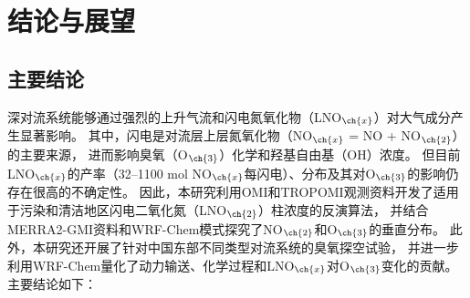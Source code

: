 
\chapter{结论与展望}

\section{主要结论}

深对流系统能够通过强烈的上升气流和闪电氮氧化物（LNO$_{\ch{x}}$）对大气成分产生显著影响。
其中，闪电是对流层上层氮氧化物（NO$_{\ch{x}}$ = NO + NO$_{\ch{2}}$）的主要来源，
进而影响臭氧（O$_{\ch{3}}$）化学和羟基自由基（OH）浓度。
但目前LNO$_{\ch{x}}$的产率（32--1100 mol NO$_{\ch{x}}$每闪电）、分布及其对O$_{\ch{3}}$的影响仍存在很高的不确定性。
因此，本研究利用OMI和TROPOMI观测资料开发了适用于污染和清洁地区闪电二氧化氮（LNO$_{\ch{2}}$）柱浓度的反演算法，
并结合MERRA2-GMI资料和WRF-Chem模式探究了NO$_{\ch{2}}$和O$_{\ch{3}}$的垂直分布。
此外，本研究还开展了针对中国东部不同类型对流系统的臭氧探空试验，
并进一步利用WRF-Chem量化了动力输送、化学过程和LNO$_{\ch{x}}$对O$_{\ch{3}}$变化的贡献。
主要结论如下：

